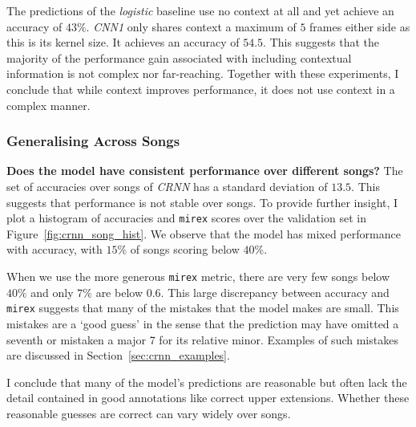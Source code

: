The predictions of the \emph{logistic} baseline use no context at all and yet achieve an accuracy of $43\%$. \emph{CNN1} only shares context a maximum of $5$ frames either side as this is its kernel size. It achieves an accuracy of $54.5$. This suggests that the majority of the performance gain associated with including contextual information is not complex nor far-reaching. Together with these experiments, I conclude that while context improves performance, it does not use context in a complex manner. 

\subsubsection{Generalising Across Songs}

\textbf{Does the model have consistent performance over different songs?} The set of accuracies over songs of \emph{CRNN} has a standard deviation of $13.5$. This suggests that performance is not stable over songs. To provide further insight, I plot a histogram of accuracies and \texttt{mirex} scores over the validation set in Figure~\ref{fig:crnn_song_hist}. We observe that the model has mixed performance with accuracy, with $15\%$ of songs scoring below $40\%$.  

When we use the more generous \texttt{mirex} metric, there are very few songs below $40\%$ and only $7\%$ are below $0.6$. This large discrepancy between accuracy and \texttt{mirex} suggests that many of the mistakes that the model makes are small. This mistakes are a `good guess' in the sense that the prediction may have omitted a seventh or mistaken a major 7 for its relative minor. Examples of such mistakes are discussed in Section~\ref{sec:crnn_examples}. 

I conclude that many of the model's predictions are reasonable but often lack the detail contained in good annotations like correct upper extensions. Whether these reasonable guesses are correct can vary widely over songs.

